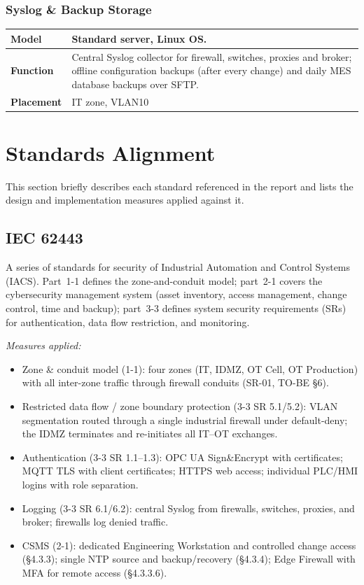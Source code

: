 \documentclass[11pt,a4paper]{article}
\renewcommand{\arraystretch}{1.15}
\begin{document}
\subsubsection{Syslog \& Backup Storage}
\renewcommand{\arraystretch}{1.3} %
\begin{tabularx}{\textwidth}{>{\bfseries}p{2.5cm} X}
    \toprule
    Model & Standard server, Linux OS. \\
    \midrule
    Function & Central Syslog collector for firewall, switches, proxies and
    broker; offline configuration backups (after every change) and daily MES
    database backups over SFTP.\\
    \midrule
    Placement & IT zone, VLAN10\\
    \midrule
\end{tabularx}

\section{Standards Alignment}
This section briefly describes each standard referenced in the report and lists
the design and implementation measures applied against it.

\subsection{IEC 62443}
A series of standards for security of Industrial Automation and Control Systems
(IACS). Part~1-1 defines the zone-and-conduit model; part~2-1 covers the
cybersecurity management system (asset inventory, access management, change
control, time and backup); part~3-3 defines system security requirements (SRs)
for authentication, data flow restriction, and monitoring.

\textit{Measures applied:}
\begin{itemize}[nosep]
  \item Zone \& conduit model (1-1): four zones (IT, IDMZ, OT Cell, OT
      Production) with all inter-zone traffic through firewall conduits (SR-01,
        TO-BE \S6).

    \item Restricted data flow / zone boundary protection (3-3 SR 5.1/5.2):
        VLAN segmentation routed through a single industrial firewall under
        default-deny; the IDMZ terminates and re-initiates all IT--OT
        exchanges.

    \item Authentication (3-3 SR 1.1--1.3): OPC UA Sign\&Encrypt with
        certificates; MQTT TLS with client certificates; HTTPS web access;
        individual PLC/HMI logins with role separation.

    \item Logging (3-3 SR 6.1/6.2): central Syslog from firewalls, switches,
        proxies, and broker; firewalls log denied traffic.

    \item CSMS (2-1): dedicated Engineering Workstation and controlled change
        access (\S4.3.3); single NTP source and backup/recovery (\S4.3.4); Edge
        Firewall with MFA for remote access (\S4.3.3.6).
\end{itemize}
\end{document}
